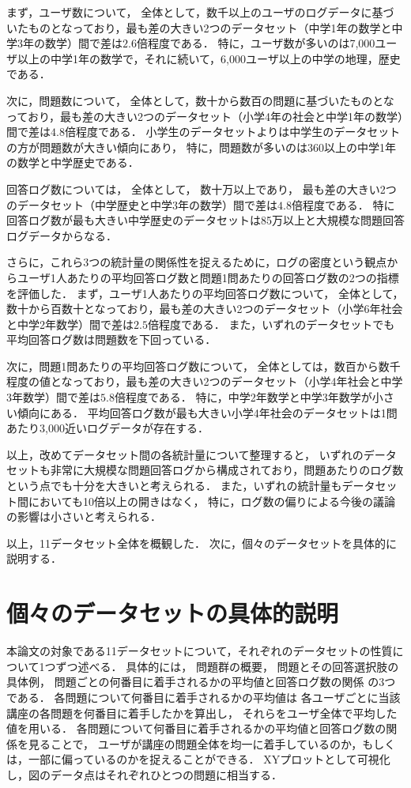 まず，ユーザ数について， 
全体として，数千以上のユーザのログデータに基づいたものとなっており，最も差の大きい2つのデータセット（中学1年の数学と中学3年の数学）間で差は$2.6$倍程度である．
特に，ユーザ数が多いのは7,000ユーザ以上の中学1年の数学で，それに続いて，6,000ユーザ以上の中学の地理，歴史である．

次に，問題数について，
全体として，数十から数百の問題に基づいたものとなっており，最も差の大きい2つのデータセット（小学4年の社会と中学1年の数学）間で差は$4.8$倍程度である．
小学生のデータセットよりは中学生のデータセットの方が問題数が大きい傾向にあり，
特に，問題数が多いのは360以上の中学1年の数学と中学歴史である．

回答ログ数については，
全体として，
数十万以上であり， 最も差の大きい2つのデータセット（中学歴史と中学3年の数学）間で差は$4.8$倍程度である．
特に回答ログ数が最も大きい中学歴史のデータセットは85万以上と大規模な問題回答ログデータからなる．

さらに，これら3つの統計量の関係性を捉えるために，ログの密度という観点からユーザ1人あたりの平均回答ログ数と問題1問あたりの回答ログ数の2つの指標を評価した．
まず，ユーザ1人あたりの平均回答ログ数について， 
全体として，数十から百数十となっており，最も差の大きい2つのデータセット（小学6年社会と中学2年数学）間で差は$2.5$倍程度である．
また，いずれのデータセットでも平均回答ログ数は問題数を下回っている．

次に，問題1問あたりの平均回答ログ数について， 
全体としては，数百から数千程度の値となっており，最も差の大きい2つのデータセット（小学4年社会と中学3年数学）間で差は$5.8$倍程度である．
特に，中学2年数学と中学3年数学が小さい傾向にある．
平均回答ログ数が最も大きい小学4年社会のデータセットは1問あたり3,000近いログデータが存在する．

以上，改めてデータセット間の各統計量について整理すると，
いずれのデータセットも非常に大規模な問題回答ログから構成されており，問題あたりのログ数という点でも十分を大きいと考えられる．
また，いずれの統計量もデータセット間においても10倍以上の開きはなく，
特に，ログ数の偏りによる今後の議論の影響は小さいと考えられる．


以上，11データセット全体を概観した．
次に，個々のデータセットを具体的に説明する．


\section{個々のデータセットの具体的説明}
本論文の対象である11データセットについて，それぞれのデータセットの性質について1つずつ述べる．
具体的には，
問題群の概要，
問題とその回答選択肢の具体例，
問題ごとの何番目に着手されるかの平均値と回答ログ数の関係
の3つである．
各問題について何番目に着手されるかの平均値は
各ユーザごとに当該講座の各問題を何番目に着手したかを算出し，
それらをユーザ全体で平均した値を用いる．
各問題について何番目に着手されるかの平均値と回答ログ数の関係を見ることで，
ユーザが講座の問題全体を均一に着手しているのか，もしくは，一部に偏っているのかを捉えることができる．
XYプロットとして可視化し，図のデータ点はそれぞれひとつの問題に相当する．

